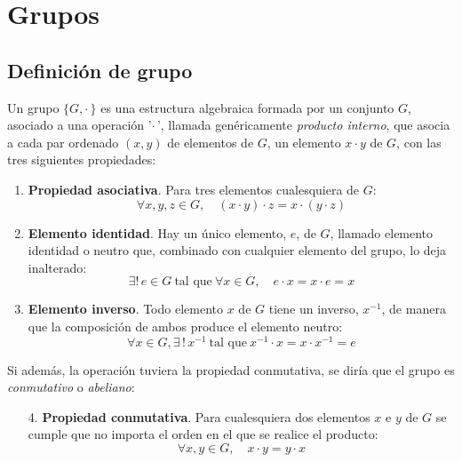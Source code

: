 %

\chapter{Grupos}

\section{Definición de grupo}
Un grupo $\{G,\cdot\,\}$ es una estructura algebraica formada por un
conjunto $G$, asociado a una operación '$\cdot\,$', llamada
genéricamente \emph{producto interno}, que asocia a cada par ordenado
$(x,y)$ de elementos de $G$, un elemento $x\cdot y$ de $G$, con las
tres siguientes propiedades:
\begin{enumerate}
\item \textbf{Propiedad asociativa}. Para tres elementos cualesquiera de $G$:
  \begin{equation}\label{eq:gru-asociativa}
    \forall x, y, z \in G, \quad (x \cdot y) \cdot z = x \cdot (y \cdot z)
  \end{equation}
\item \textbf{Elemento identidad}. Hay un único elemento, $e$, de $G$, llamado
  elemento identidad o neutro que, combinado con cualquier elemento del grupo,
  lo deja inalterado:
  \begin{equation}\label{eq:gru-identidad}
    \exists !\, e \in G \ \text{tal que}\ \forall x \in G, \quad e \cdot x
    = x \cdot e = x
  \end{equation}
\item \textbf{Elemento inverso}. Todo elemento $x$ de $G$ tiene un
  inverso\footnotemark, $x^{-1}$, de manera que la composición de ambos
  produce el elemento neutro: 
  \begin{equation}\label{eq:gru-inverso}
    \forall x \in G, \exists\, !\, x^{-1} \
    \text{tal que}\ x^{-1} \cdot x = x \cdot  x^{-1} = e
  \end{equation}
\end{enumerate}

Si además, la operación tuviera la propiedad conmutativa, se diría que
el grupo es \emph{conmutativo} o \emph{abeliano}:
\begin{enumerate}
\item[4.] \textbf{Propiedad conmutativa}. Para cualesquiera dos
  elementos $x$ e $y$ de $G$ se cumple que no importa el orden en el
  que se realice el producto:
  \begin{equation}\label{eq:gru-conmutativa}
    \forall x,y \in G, \quad x \cdot y = y \cdot x
  \end{equation}
\end{enumerate}



 
